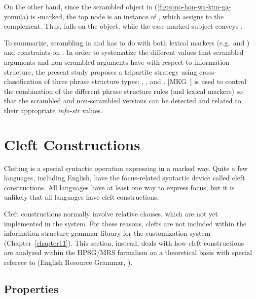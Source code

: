 \noindent On the other hand, since the scrambled object in
(\ref{fig:sono-hon-wa-kim-ga-yomu}a) is {\wa}-marked, the top node is
an instance of , which assigns
 to the complement. Thus,  falls on the
object, while the case-marked subject conveys .


To summarize, scrambling in
 and  has to do with both lexical markers
(e.g.\ \wa and \nun) and constraints on
. In order to systematize the
different values that scrambled arguments and non-scrambled arguments
have with respect to information structure, the present study proposes
a tripartite strategy using cross-classification of three phrase
structure types: , , and
. \mbox{[MKG ]} is used to control
the combination of the different phrase structure rules (and lexical
markers) so that the scrambled and non-scrambled versions can be
detected and related to their appropriate \textit{info-str}
values.



\section{Cleft Constructions}
\label{10:sec:clefts}


Clefting is a special syntactic operation expressing  in a marked
way. Quite a few languages, including English, have the
focus-related syntactic device called cleft constructions.  All
languages have at least one way to express focus, but it is unlikely
that all languages have cleft constructions.


Cleft constructions normally involve relative clauses, which are not yet implemented in the \lingo {} system.  For these reasons, clefts are not included within
the information structure grammar library for the customization system
(Chapter~\ref{chapter11}).  This section, instead, deals with how
cleft constructions are analyzed within the HPSG/MRS formalism on a
theoretical basis with special referece to  (English Resource
Grammar, \citealt{flickinger:00}).



\subsection{Properties}
\label{10:sssec:clefts:properties}



